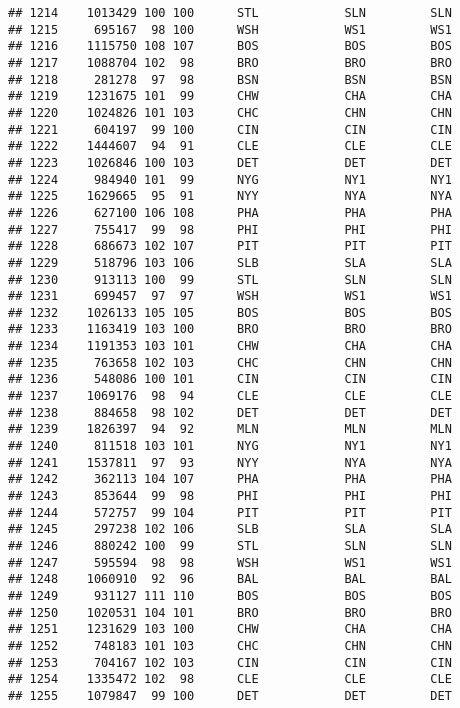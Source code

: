 \documentclass[]{article}
\begin{document}
\begin{verbatim}
## 1214    1013429 100 100      STL            SLN         SLN
## 1215     695167  98 100      WSH            WS1         WS1
## 1216    1115750 108 107      BOS            BOS         BOS
## 1217    1088704 102  98      BRO            BRO         BRO
## 1218     281278  97  98      BSN            BSN         BSN
## 1219    1231675 101  99      CHW            CHA         CHA
## 1220    1024826 101 103      CHC            CHN         CHN
## 1221     604197  99 100      CIN            CIN         CIN
## 1222    1444607  94  91      CLE            CLE         CLE
## 1223    1026846 100 103      DET            DET         DET
## 1224     984940 101  99      NYG            NY1         NY1
## 1225    1629665  95  91      NYY            NYA         NYA
## 1226     627100 106 108      PHA            PHA         PHA
## 1227     755417  99  98      PHI            PHI         PHI
## 1228     686673 102 107      PIT            PIT         PIT
## 1229     518796 103 106      SLB            SLA         SLA
## 1230     913113 100  99      STL            SLN         SLN
## 1231     699457  97  97      WSH            WS1         WS1
## 1232    1026133 105 105      BOS            BOS         BOS
## 1233    1163419 103 100      BRO            BRO         BRO
## 1234    1191353 103 101      CHW            CHA         CHA
## 1235     763658 102 103      CHC            CHN         CHN
## 1236     548086 100 101      CIN            CIN         CIN
## 1237    1069176  98  94      CLE            CLE         CLE
## 1238     884658  98 102      DET            DET         DET
## 1239    1826397  94  92      MLN            MLN         MLN
## 1240     811518 103 101      NYG            NY1         NY1
## 1241    1537811  97  93      NYY            NYA         NYA
## 1242     362113 104 107      PHA            PHA         PHA
## 1243     853644  99  98      PHI            PHI         PHI
## 1244     572757  99 104      PIT            PIT         PIT
## 1245     297238 102 106      SLB            SLA         SLA
## 1246     880242 100  99      STL            SLN         SLN
## 1247     595594  98  98      WSH            WS1         WS1
## 1248    1060910  92  96      BAL            BAL         BAL
## 1249     931127 111 110      BOS            BOS         BOS
## 1250    1020531 104 101      BRO            BRO         BRO
## 1251    1231629 103 100      CHW            CHA         CHA
## 1252     748183 101 103      CHC            CHN         CHN
## 1253     704167 102 103      CIN            CIN         CIN
## 1254    1335472 102  98      CLE            CLE         CLE
## 1255    1079847  99 100      DET            DET         DET

\end{verbatim}
\end{document}
